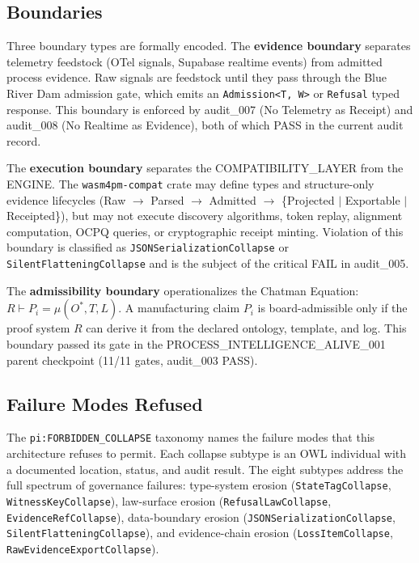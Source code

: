 \subsection{Boundaries}
\label{sec:research-pi-program-arch-boundaries}

Three boundary types are formally encoded. The \textbf{evidence boundary} separates telemetry feedstock (OTel signals, Supabase realtime events) from admitted process evidence. Raw signals are feedstock until they pass through the Blue River Dam admission gate, which emits an \texttt{Admission<T, W>} or \texttt{Refusal} typed response. This boundary is enforced by audit\_007 (No Telemetry as Receipt) and audit\_008 (No Realtime as Evidence), both of which PASS in the current audit record.

The \textbf{execution boundary} separates the COMPATIBILITY\_LAYER from the ENGINE. The \texttt{wasm4pm-compat} crate may define types and structure-only evidence lifecycles (Raw $\to$ Parsed $\to$ Admitted $\to$ \{Projected $|$ Exportable $|$ Receipted\}), but may not execute discovery algorithms, token replay, alignment computation, OCPQ queries, or cryptographic receipt minting. Violation of this boundary is classified as \texttt{JSONSerializationCollapse} or \texttt{SilentFlatteningCollapse} and is the subject of the critical FAIL in audit\_005.

The \textbf{admissibility boundary} operationalizes the Chatman Equation: \( R \vdash P_i = \mu(O^{*}, T, L) \). A manufacturing claim $P_i$ is board-admissible only if the proof system $R$ can derive it from the declared ontology, template, and log. This boundary passed its gate in the PROCESS\_INTELLIGENCE\_ALIVE\_001 parent checkpoint (11/11 gates, audit\_003 PASS).

\subsection{Failure Modes Refused}
\label{sec:research-pi-program-arch-failures}

The \texttt{pi:FORBIDDEN\_COLLAPSE} taxonomy names the failure modes that this architecture refuses to permit. Each collapse subtype is an OWL individual with a documented location, status, and audit result. The eight subtypes address the full spectrum of governance failures: type-system erosion (\texttt{StateTagCollapse}, \texttt{WitnessKeyCollapse}), law-surface erosion (\texttt{RefusalLawCollapse}, \texttt{EvidenceRefCollapse}), data-boundary erosion (\texttt{JSONSerializationCollapse}, \texttt{SilentFlatteningCollapse}), and evidence-chain erosion (\texttt{LossItemCollapse}, \texttt{RawEvidenceExportCollapse}).

